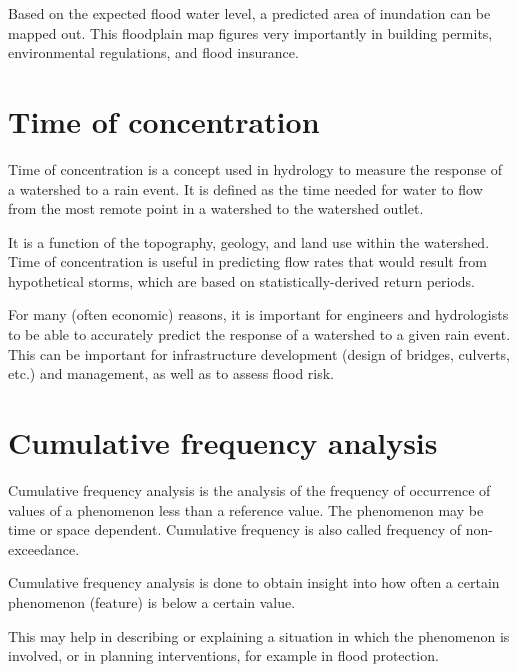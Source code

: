 Based on the expected flood water level, a predicted area of inundation can be mapped out. This floodplain map figures very
importantly in building permits, environmental regulations, and flood insurance.

\section{Time of concentration}
Time of concentration is a concept used in hydrology to measure the response of a watershed to a rain event. It is defined as the
time needed for water to flow from the most remote point in a watershed to the watershed outlet.

It is a function of the topography, geology, and land use within the watershed. Time of concentration is useful in predicting flow
rates that would result from hypothetical storms, which are based on statistically-derived return periods.

For many (often economic) reasons, it is important for engineers and hydrologists to be able to accurately predict the response of a watershed to a given rain event. This can be important for
infrastructure development (design of bridges, culverts, etc.) and management, as well as to assess flood risk.

\section{Cumulative frequency analysis}

Cumulative frequency analysis is the analysis of the frequency of occurrence of values of a phenomenon less than a reference value. The phenomenon may be time or space dependent. Cumulative frequency is also called frequency of non-exceedance.

Cumulative frequency analysis is done to obtain insight into how often a certain phenomenon (feature) is below a certain value.

This may help in describing or explaining a situation in which the phenomenon is involved, or in planning interventions, for example
in flood protection.

